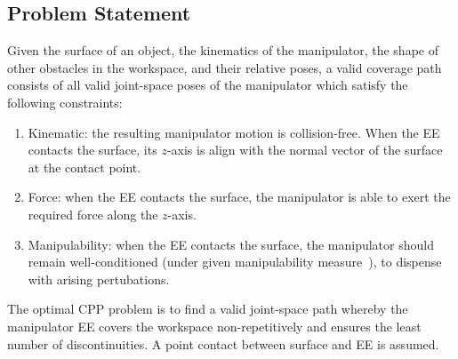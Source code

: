 \documentclass[journal]{IEEEtran}
\begin{document}
\subsection{Problem Statement}
Given the surface of an object, the kinematics of the manipulator, the shape of other obstacles in the workspace, and their relative poses, a valid coverage path consists of all valid joint-space poses of the manipulator which satisfy the following constraints:
\begin{enumerate}
\item Kinematic: the resulting manipulator motion is collision-free. When the EE contacts the surface, its $z$-axis is align with the normal vector of the surface at the contact point. 
\item Force: when the EE contacts the surface, the manipulator is able to exert the required force along the $z$-axis.  
\item Manipulability: when the EE contacts the surface, the manipulator should remain well-conditioned (under given manipulability measure~\cite{yoshikawa1990translational}), to dispense with arising pertubations. 
\end{enumerate}

\noindent
The optimal CPP problem is to find a valid joint-space path whereby the manipulator EE covers the workspace non-repetitively and ensures the least number of discontinuities. A point contact between surface and EE is assumed.


%

\end{document}
